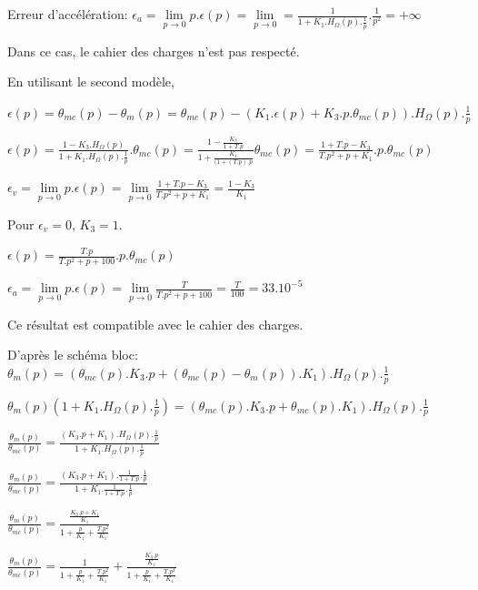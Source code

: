 \cor

Erreur d'accélération: $\epsilon_a=\lim\limits_{p\rightarrow 0}p.\epsilon(p)=\lim\limits_{p\rightarrow 0}=\frac{1}{1+K_1.H_\Omega(p).\frac{1}{p}}.\frac{1}{p^2}=+\infty$

Dans ce cas, le cahier des charges n'est pas respecté.

\cor

En utilisant le second modèle,

$\epsilon(p)=\theta_{mc}(p)-\theta_{m}(p)=\theta_{mc}(p)-\left(K_1.\epsilon(p)+K_3.p.\theta_{mc}(p)\right).H_\Omega(p).\frac{1}{p}$

$\epsilon(p)=\frac{1-K_3.H_\Omega(p)}{1+K_1.H_\Omega(p).\frac{1}{p}}.\theta_{mc}(p)=\frac{1-\frac{K_3}{1+T.p}}{1+\frac{K_1}{(1+(T.p).p}}\theta_{mc}(p)=\frac{1+T.p-K_3}{T.p^2+p+K_1}.p.\theta_{mc}(p)$

\cor

$\epsilon_v=\lim\limits_{p\rightarrow 0}p.\epsilon(p)=\lim\limits_{p\rightarrow 0}\frac{1+T.p-K_3}{T.p^2+p+K_1}=\frac{1-K_3}{K_1}$

Pour $\epsilon_v=0$, $K_3=1$.

\cor

$\epsilon(p)=\frac{T.p}{T.p^2+p+100}.p.\theta_{mc}(p)$

$\epsilon_a=\lim\limits_{p\rightarrow 0}p.\epsilon(p)=\lim\limits_{p\rightarrow 0}\frac{T}{T.p^2+p+100}=\frac{T}{100}=33.10^{-5}$

Ce résultat est compatible avec le cahier des charges.

\cor

D'après le schéma bloc:\\
$\theta_m(p)=\left(\theta_{mc}(p).K_3.p+\left(\theta_{mc}(p)-\theta_{m}(p)\right).K_1\right).H_\Omega(p).\frac{1}{p}$

$\theta_m(p)\left(1+K_1.H_\Omega(p).\frac{1}{p}\right)=\left(\theta_{mc}(p).K_3.p+\theta_{mc}(p).K_1\right).H_\Omega(p).\frac{1}{p}$

$\frac{\theta_m(p)}{\theta_{mc}(p)}=\frac{\left(K_3.p+K_1\right).H_\Omega(p).\frac{1}{p}}{1+K_1.H_\Omega(p).\frac{1}{p}}$

$\frac{\theta_m(p)}{\theta_{mc}(p)}=\frac{\left(K_3.p+K_1\right).\frac{1}{1+T.p}.\frac{1}{p}}{1+K_1.\frac{1}{1+T.p}.\frac{1}{p}}$

$\frac{\theta_m(p)}{\theta_{mc}(p)}=\frac{\frac{K_3.p+K_1}{K_1}}{1+\frac{p}{K_1}+\frac{T.p^2}{K_1}}$

$\frac{\theta_m(p)}{\theta_{mc}(p)}=\frac{1}{1+\frac{p}{K_1}+\frac{T.p^2}{K_1}}+\frac{\frac{K_3.p}{K_1}}{1+\frac{p}{K_1}+\frac{T.p^2}{K_1}}$

